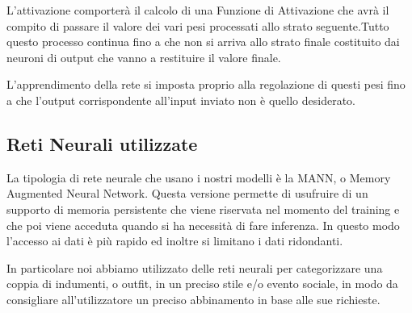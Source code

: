 L'attivazione comporterà il calcolo di una Funzione di Attivazione che avrà il compito di passare il valore dei vari pesi processati allo strato seguente.Tutto questo processo continua fino a che non si arriva allo strato finale costituito dai neuroni di output che vanno a restituire il valore finale.

L'apprendimento della rete si imposta proprio alla regolazione di questi pesi fino a che l'output corrispondente all'input inviato non è quello desiderato.

\subsection{Reti Neurali utilizzate}

La tipologia di rete neurale che usano i nostri modelli è la MANN, o Memory Augmented Neural Network. Questa versione permette di usufruire di un supporto di memoria persistente che viene riservata nel momento del training e che poi viene acceduta quando si ha necessità di fare inferenza. In questo modo l'accesso ai dati è più rapido ed inoltre si limitano i dati ridondanti.

In particolare noi abbiamo utilizzato delle reti neurali per categorizzare una coppia di indumenti, o outfit, in un preciso stile e/o evento sociale, in modo da consigliare all'utilizzatore un preciso abbinamento in base alle sue richieste.

